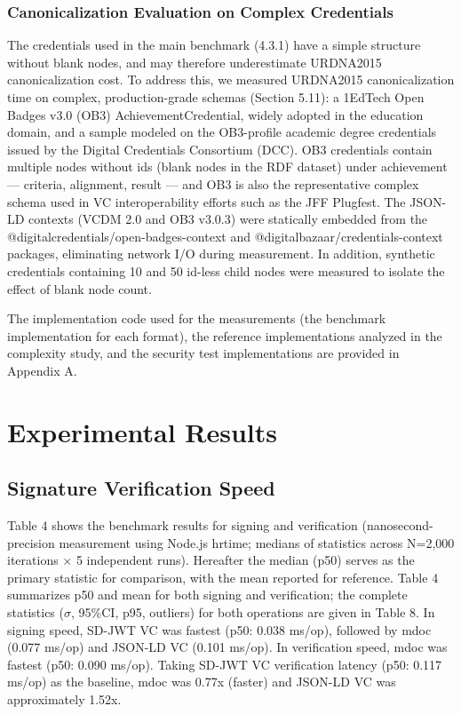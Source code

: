 \documentclass[conference]{IEEEtran}
\begin{document}
\subsubsection{Canonicalization Evaluation on Complex Credentials}

The credentials used in the main benchmark (4.3.1) have a simple structure without blank nodes, and may therefore underestimate URDNA2015 canonicalization cost. To address this, we measured URDNA2015 canonicalization time on complex, production-grade schemas (Section 5.11): a 1EdTech Open Badges v3.0 (OB3) AchievementCredential, widely adopted in the education domain, and a sample modeled on the OB3-profile academic degree credentials issued by the Digital Credentials Consortium (DCC). OB3 credentials contain multiple nodes without ids (blank nodes in the RDF dataset) under achievement --- criteria, alignment, result --- and OB3 is also the representative complex schema used in VC interoperability efforts such as the JFF Plugfest. The JSON-LD contexts (VCDM 2.0 and OB3 v3.0.3) were statically embedded from the @digitalcredentials/open-badges-context and @digitalbazaar/credentials-context packages, eliminating network I/O during measurement. In addition, synthetic credentials containing 10 and 50 id-less child nodes were measured to isolate the effect of blank node count.

The implementation code used for the measurements (the benchmark implementation for each format), the reference implementations analyzed in the complexity study, and the security test implementations are provided in Appendix A.

\section{Experimental Results}

\subsection{Signature Verification Speed}

Table 4 shows the benchmark results for signing and verification (nanosecond-precision measurement using Node.js hrtime; medians of statistics across N=2,000 iterations $\times$ 5 independent runs). Hereafter the median (p50) serves as the primary statistic for comparison, with the mean reported for reference. Table 4 summarizes p50 and mean for both signing and verification; the complete statistics ($\sigma$, 95\%CI, p95, outliers) for both operations are given in Table 8. In signing speed, SD-JWT VC was fastest (p50: 0.038 ms/op), followed by mdoc (0.077 ms/op) and JSON-LD VC (0.101 ms/op). In verification speed, mdoc was fastest (p50: 0.090 ms/op). Taking SD-JWT VC verification latency (p50: 0.117 ms/op) as the baseline, mdoc was 0.77x (faster) and JSON-LD VC was approximately 1.52x.
\end{document}

